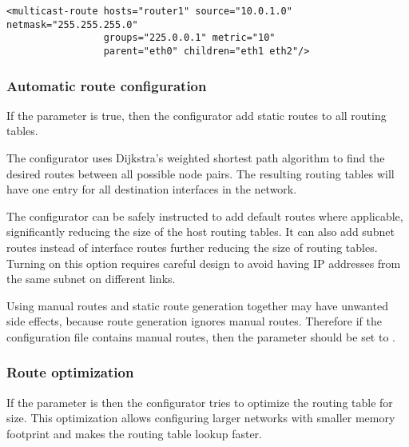 \begin{verbatim}
<multicast-route hosts="router1" source="10.0.1.0" netmask="255.255.255.0"
                 groups="225.0.0.1" metric="10"
                 parent="eth0" children="eth1 eth2"/>
\end{verbatim}

\subsubsection*{Automatic route configuration}

If the  parameter is true, then
the configurator add static routes to all routing tables.

The configurator uses Dijkstra's weighted shortest path algorithm to find
the desired routes between all possible node pairs. The resulting
routing tables will have one entry for all destination interfaces in the
network.


The configurator can be safely instructed to add default routes
where applicable, significantly reducing the size of the host routing
tables. It can also add subnet routes instead of interface routes further
reducing the size of routing tables. Turning on this option requires
careful design to avoid having IP addresses from the same subnet on
different links.


\begin{caution}
Using manual routes and static route generation
together may have unwanted side effects, because route generation ignores
manual routes. Therefore if the configuration file contains
manual routes, then the  parameter should be set
to .
\end{caution}

\subsubsection*{Route optimization}

If the  parameter is  then the
configurator tries to optimize the routing table for size.
This optimization allows configuring larger networks with smaller
memory footprint and makes the routing table lookup faster.

